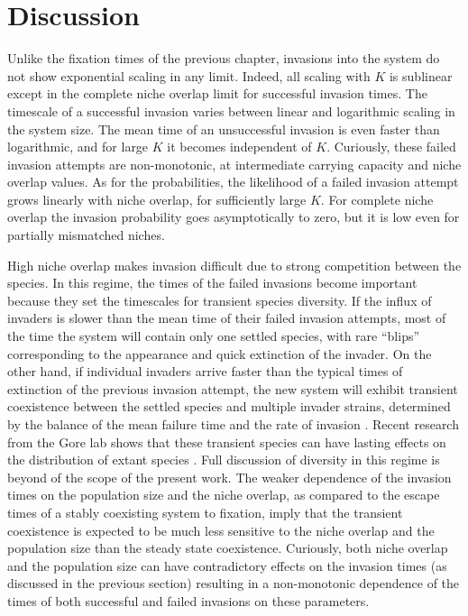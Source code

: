 \section{Discussion} \label{DiscussionOfOneAttemptedInvasion}
Unlike the fixation times of the previous chapter, invasions into the system do not show exponential scaling in any limit. 
Indeed, all scaling with $K$ is sublinear except in the complete niche overlap limit for successful invasion times. 
The timescale of a successful invasion varies between linear and logarithmic scaling in the system size. 
The mean time of an unsuccessful invasion is even faster than logarithmic, and for large $K$ it becomes independent of $K$. 
Curiously, these failed invasion attempts are non-monotonic, at intermediate carrying capacity and niche overlap values. %
As for the probabilities, the likelihood of a failed invasion attempt grows linearly with niche overlap, for sufficiently large $K$. 
For complete niche overlap the invasion probability goes asymptotically to zero, but it is low even for partially mismatched niches. 

High niche overlap makes invasion difficult due to strong competition between the species. 
In this regime, the times of the failed invasions become important because they set the timescales for transient species diversity. 
If the influx of invaders is slower than the mean time of their failed invasion attempts, most of the time the system will contain only one settled species, with rare ``blips'' corresponding to the appearance and quick extinction of the invader. 
On the other hand, if individual invaders arrive faster than the typical times of extinction of the previous invasion attempt, the new system will exhibit transient coexistence between the settled species and multiple invader strains, determined by the balance of the mean failure time and the rate of invasion \cite{Dias1996,Chesson2000,Hubbell2001,Desai2007,Carroll2015}. 
Recent research from the Gore lab shows that these transient species can have lasting effects on the distribution of extant species \cite{Amor2019}. %
Full discussion of diversity in this regime is beyond of the scope of the present work. %
The weaker dependence of the invasion times on the population size and the niche overlap, as compared to the escape times of a stably coexisting system to fixation, imply that the transient coexistence is expected to be much less sensitive to the niche overlap and the population size than the steady state coexistence. 
Curiously, both niche overlap and the population size can have contradictory effects on the invasion times (as discussed in the previous section) resulting in a non-monotonic dependence of the times of both successful and failed invasions on these parameters. 

